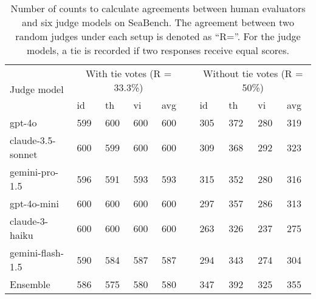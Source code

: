 \begin{table*}[!ht]
    \centering
    \small
    \begin{tabular}{llllllllll}
        \toprule
         \multirow{2}{*}{Judge model}& \multicolumn{4}{c}{With tie votes (R = 33.3\%)} & & \multicolumn{4}{c}{Without tie votes (R = 50\%)} \\ 
         \cmidrule{2-5} \cmidrule{7-10}
        & id & th & vi & avg & & id & th & vi & avg \\ 
        \midrule
        gpt-4o & 599 & 600 & 600 & 600 & & 305 & 372 & 280 & 319 \\ 
        claude-3.5-sonnet & 600 & 599 & 600 & 600 & & 309 & 368 & 292 & 323 \\ 
        gemini-pro-1.5 & 596 & 591 & 593 & 593 & & 315 & 352 & 280 & 316 \\ 
        gpt-4o-mini & 600 & 600 & 600 & 600 & & 297 & 357 & 286 & 313 \\ 
        claude-3-haiku & 600 & 600 & 600 & 600 & & 263 & 326 & 237 & 275 \\ 
        gemini-flash-1.5 & 590 & 584 & 587 & 587 & & 294 & 343 & 274 & 304 \\ 
        \midrule
        Ensemble & 586 & 575 & 580 & 580 &  & 347 & 392 & 325 & 355 \\
        \bottomrule
    \end{tabular}
    \caption{Number of counts to calculate agreements between human evaluators and six judge models on SeaBench. The agreement between two random judges under each setup is denoted as “R=”. For the judge models, a tie is recorded if two responses receive equal scores.}
    \label{tab:seabench_agreement_count_0}
\end{table*}